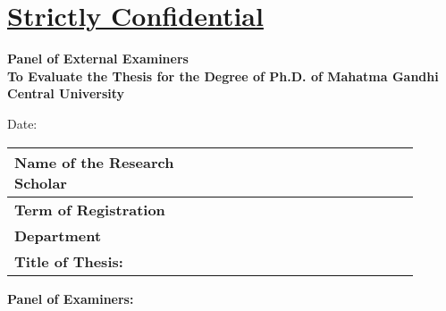 \chapter*{\uline{Strictly Confidential}}

\begin{center} 
\textbf{\normalsize Panel of External Examiners} \\ 
\textbf{\normalsize To Evaluate the Thesis for the Degree of Ph.D. of Mahatma Gandhi Central University} 
\end{center} 
\vspace{-.9cm} 
\begin{flushright} 
Date: \underline{\hspace{3cm}} 
\end{flushright} 
\vspace{-.6cm} 

\begin{table}[!htp] 
\centering 
\setlength{\tabcolsep}{10pt} {\renewcommand{\arraystretch}{1.5}%
\begin{tabular}{|p{0.4\linewidth}|p{0.5\linewidth}|} \hline 
\textbf{Name of the Research Scholar} & \\ \hline 
\textbf{Term of Registration} & \\ \hline 
\textbf{Department} & \\ \hline 
\multicolumn{2}{|p{0.9\linewidth}|}{\textbf{Title of Thesis:}} \\ \hline %
\end{tabular}} 
\end{table}
\vspace{-.45cm} 
\textbf{Panel of Examiners:} \vspace{-.4cm} 



